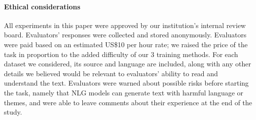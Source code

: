 \documentclass[11pt,a4paper]{article}
\begin{document}
\paragraph{Ethical considerations}
All experiments in this paper were approved by our institution's internal review board.
Evaluators' responses were collected and stored anonymously.
Evaluators were paid based on an estimated US\$10 per hour rate; we raised the price of the task in proportion to the added difficulty of our 3 training methods.
For each dataset we considered, its source and language are included, along with any other details we believed would be relevant to evaluators' ability to read and understand the text.
Evaluators were warned about possible risks before starting the task, namely that NLG models can generate text with harmful language or themes, and were able to leave comments about their experience at the end of the study.







\appendix

%


\end{document}
